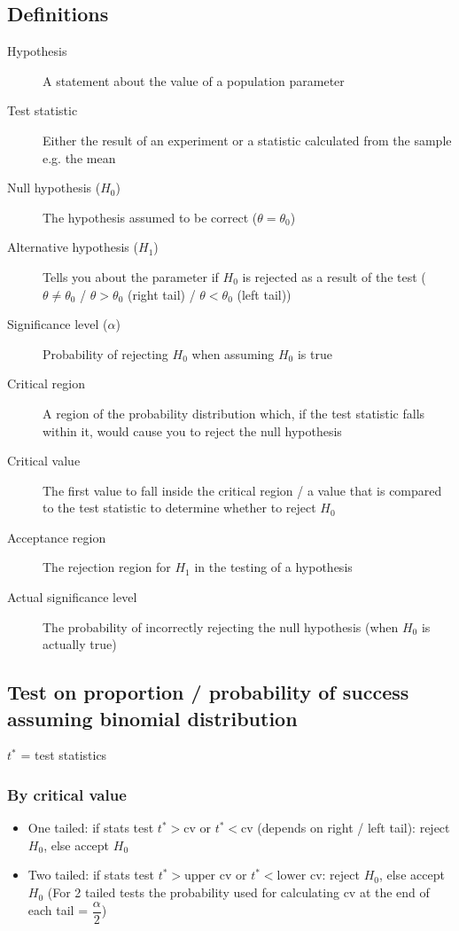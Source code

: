 \documentclass[fleqn, 11pt]{article}
\begin{document}
	\subsection{Definitions}
	\begin{description}
		\item[Hypothesis] A statement about the value of a population parameter
		\item[Test statistic] Either the result of an experiment or a statistic calculated from the sample e.g. the mean
		\item[Null hypothesis ($H_0$)] The hypothesis assumed to be correct ($\theta=\theta_0$)
		\item[Alternative hypothesis ($H_1$)] Tells you about the parameter if $H_0$ is rejected as a result of the test ($\theta \neq \theta_0$ / $\theta>\theta_0$ (right tail) / $\theta<\theta_0$ (left tail))
		\item[Significance level ($\alpha$)] Probability of rejecting $H_0$ when assuming $H_0$ is true
		\item[Critical region] A region of the probability distribution which, if the test statistic falls within it, would cause you to reject the null hypothesis
		\item[Critical value] The first value to fall inside the critical region / a value that is compared to the test statistic to determine whether to reject $H_0$
		\item[Acceptance region] The rejection region for $H_1$ in the testing of a hypothesis
		\item[Actual significance level] The probability of incorrectly rejecting the null hypothesis (when $H_0$ is actually true)
	\end{description}
	
	\subsection{Test on proportion / probability of success assuming binomial distribution}
	$t^*$ = test statistics
	\subsubsection{By critical value}
	\begin{itemize}
		\item One tailed: if stats test $t^* > \text{cv}$ or $t^* < \text{cv}$ (depends on right / left tail): reject $H_0$, else accept $H_0$
		\item Two tailed: if stats test $t^* > \text{upper cv}$ or $t^* < \text{lower cv}$: reject $H_0$, else accept $H_0$ (For 2 tailed tests the probability used for calculating cv at the end of each tail = $\dfrac{\alpha}{2}$)
	\end{itemize}
	
\end{document}
